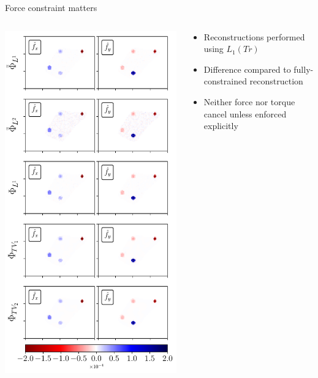 \documentclass[presentation]{beamer}
\begin{document}
\begin{frame}{Force constraint matters}
\centering
\begin{columns}
\begin{column}{0.6\textwidth}
\includegraphics[width=\textwidth]{figures/fig3}
\end{column}
\begin{column}{0.4\textwidth}
\begin{itemize}
\item Reconstructions performed using $L_1(Tr)$
\item Difference compared to fully-constrained reconstruction
\item Neither force nor torque cancel unless enforced explicitly
\end{itemize}
\end{column}
\end{columns}
\end{frame}
\end{document}

